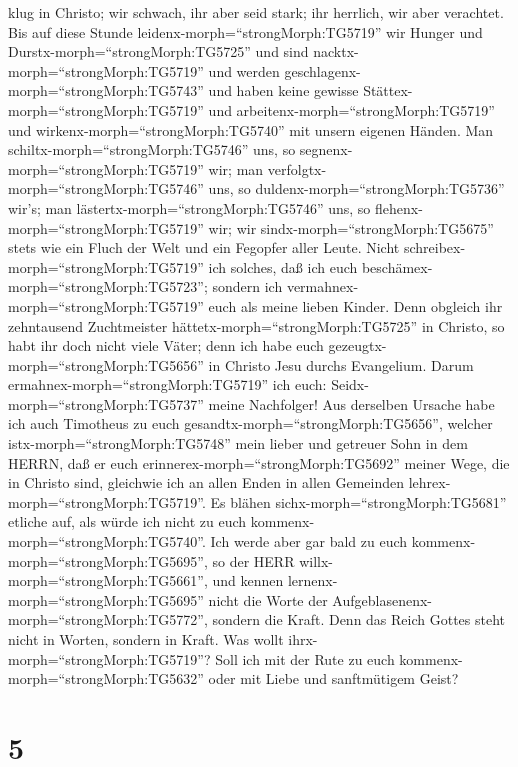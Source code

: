 klug in Christo; wir schwach, ihr aber seid stark; ihr herrlich, wir
aber verachtet.  Bis auf diese Stunde
leidenx-morph=``strongMorph:TG5719'' wir Hunger und
Durstx-morph=``strongMorph:TG5725'' und sind
nacktx-morph=``strongMorph:TG5719'' und werden
geschlagenx-morph=``strongMorph:TG5743'' und haben keine gewisse
Stättex-morph=``strongMorph:TG5719''  und
arbeitenx-morph=``strongMorph:TG5719'' und
wirkenx-morph=``strongMorph:TG5740'' mit unsern eigenen Händen. Man
schiltx-morph=``strongMorph:TG5746'' uns, so
segnenx-morph=``strongMorph:TG5719'' wir; man
verfolgtx-morph=``strongMorph:TG5746'' uns, so
duldenx-morph=``strongMorph:TG5736'' wir's; man
lästertx-morph=``strongMorph:TG5746'' uns, so
flehenx-morph=``strongMorph:TG5719'' wir;  wir
sindx-morph=``strongMorph:TG5675'' stets wie ein Fluch der Welt und ein
Fegopfer aller Leute.  Nicht
schreibex-morph=``strongMorph:TG5719'' ich solches, daß ich euch
beschämex-morph=``strongMorph:TG5723''; sondern ich
vermahnex-morph=``strongMorph:TG5719'' euch als meine lieben Kinder.
 Denn obgleich ihr zehntausend Zuchtmeister
hättetx-morph=``strongMorph:TG5725'' in Christo, so habt ihr doch nicht
viele Väter; denn ich habe euch gezeugtx-morph=``strongMorph:TG5656'' in
Christo Jesu durchs Evangelium.  Darum
ermahnex-morph=``strongMorph:TG5719'' ich euch:
Seidx-morph=``strongMorph:TG5737'' meine Nachfolger!  Aus
derselben Ursache habe ich auch Timotheus zu euch
gesandtx-morph=``strongMorph:TG5656'', welcher
istx-morph=``strongMorph:TG5748'' mein lieber und getreuer Sohn in dem
HERRN, daß er euch erinnerex-morph=``strongMorph:TG5692'' meiner Wege,
die in Christo sind, gleichwie ich an allen Enden in allen Gemeinden
lehrex-morph=``strongMorph:TG5719''.  Es blähen
sichx-morph=``strongMorph:TG5681'' etliche auf, als würde ich nicht zu
euch kommenx-morph=``strongMorph:TG5740''.  Ich werde aber
gar bald zu euch kommenx-morph=``strongMorph:TG5695'', so der HERR
willx-morph=``strongMorph:TG5661'', und kennen
lernenx-morph=``strongMorph:TG5695'' nicht die Worte der
Aufgeblasenenx-morph=``strongMorph:TG5772'', sondern die Kraft.
 Denn das Reich Gottes steht nicht in Worten, sondern in
Kraft.  Was wollt ihrx-morph=``strongMorph:TG5719''? Soll
ich mit der Rute zu euch kommenx-morph=``strongMorph:TG5632'' oder mit
Liebe und sanftmütigem Geist?

\hypertarget{section-4}{%
\section{5}\label{section-4}}


